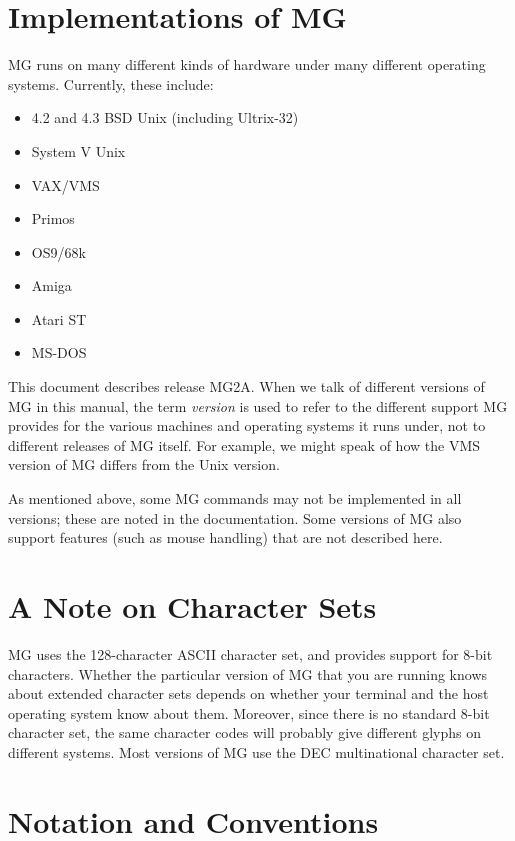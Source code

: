 \section{Implementations of MG}

MG runs on many different kinds of hardware under many different 
operating systems.  Currently, these include:

\begin{itemize}

\item 4.2 and 4.3 BSD Unix (including Ultrix-32)
\item System V Unix
\item VAX/VMS
\item Primos
\item OS9/68k
\item Amiga
\item Atari ST
\item MS-DOS

\end{itemize}

This document describes release MG2A.  When we talk of different
versions of MG in this manual, the term {\em version\/} is used to
refer to the different support MG provides for the various machines
and operating systems it runs under, not to different releases of MG
itself.  For example, we might speak of how the VMS version of MG
differs from the Unix version.

As mentioned above, some MG commands may not be implemented in all
versions; these are noted in the documentation.  Some versions of MG
also support features (such as mouse handling) that are not described
here.

\section{A Note on Character Sets}

MG uses the 128-character ASCII character set, and provides support for
8-bit characters.  Whether the particular version of MG that you are running
knows about extended character sets depends on whether your terminal and
the host operating system know about them.  Moreover, since there is no
standard 8-bit character set, the same character codes will probably
give different glyphs on different systems.  Most versions of MG use
the DEC multinational character set.

\section{Notation and Conventions}

